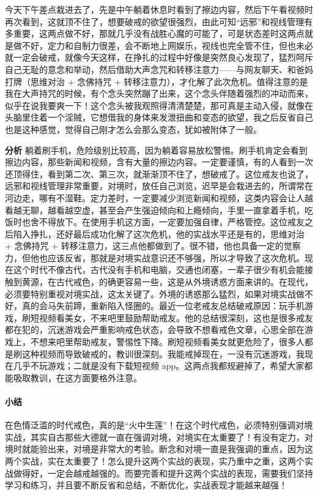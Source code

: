 \begin{case}
    今天下午差点栽进去了，先是中午躺着休息时看到了擦边内容，然后下午看视频时再次看到，这就顶不住了，想要破戒的欲望很强烈，由此可知“远邪”和视线管理有多重要，这两点做不好，那就几乎没有战胜心魔的可能了，可是状态差时这两点就是做不好，定力和自制力很差，会不断地上网娱乐，视线也完全管不住，但也未必就一定会破戒，就像今天这样，在挣扎的过程中好像是突然良心发现了，猛烈呵斥自己无耻的意念和举动，然后借助大声念咒和转移注意力——与网友聊天、和爸妈打牌（思维对治 + 念佛持咒 + 转移注意力），才化解了此次危机。值得注意的是我在大声持咒的时候，有个念头突然蹦了出来，这个念头伴随着强烈的冲动而来，似乎在说我要爽一下！这个念头被我观照得清清楚楚，那可真是主动入侵，就像在头脑里住着一个淫贼，它想借我的身体来发泄扭曲和变态的欲望，我之后反省自己也是这种感觉，觉得自己刚才怎么会那么变态，犹如被附体了一般。

    \textbf{分析} 躺着刷手机，危险级别比较高，因为躺着容易放松警惕。刷手机肯定会看到擦边内容，那些新闻和视频，含有大量的擦边内容。一定要谨慎，有的人看到一次还顶得住，看到第二次、第三次，就渐渐顶不住了，想破戒了。这位戒友也说了，远邪和视线管理非常重要，对境时，放任自己浏览，迟早是会栽进去的，所谓常在河边走，哪有不湿鞋。定力差时，一定要减少浏览新闻和视频，这类内容会让人越看越无聊，越看越空虚，甚至会产生强迫倾向和上瘾倾向，手里一直拿着手机，吃饭时也舍不得放下。在使用手机这方面，一定要加强自律，严格管控。这位戒友之后陷入挣扎，还好最后成功化解了这次危机，他的实战水平还是有的，思维对治 + 念佛持咒 + 转移注意力，这三点他都做到了。很不错，他也具备一定的觉察力，但他也应该反省，那就是对境实战意识还不够强，所以才导致了这次危机。现在这个时代不像古代，古代没有手机和电脑，交通也闭塞，一辈子很少有机会能接触到黄源，在古代戒色，的确更容易一些，这是从外境诱惑方面来讲的。在现代，必须要特别重视对境实战，这太关键了。外境的诱惑那么猛烈，如果对境实战做不好，真的会马失前蹄，重新陷入怪圈的。最近一位老戒友总结破戒原因：玩手机游戏，刷短视频看美女，不来吧里鼓励帮助戒友。他的总结很深刻，这也是很多戒友都在犯的，沉迷游戏会严重影响戒色状态，会导致不想看戒色文章，心思全部在游戏上，不想来吧里帮助戒友，警惕性下降。刷短视频看美女就更危险了，很多人都是刷这种视频而导致破戒的，教训很深刻。我能戒掉现在，一没有沉迷游戏，我现在几乎不玩游戏；二就是没有下载短视频 app。这两点我都规避掉了，希望大家都能吸取教训，在这方面要格外注意。
\end{case}

\paragraph*{小结}

在色情泛滥的时代戒色，真的是“火中生莲”！在这个时代戒色，必须特别强调对境实战，其实自古那些大德就一直在强调对境，对境实在太重要了！有没有定力，对境时就能验出来，对境是非常大的考验。断念和对境一直是我强调的重点，因为这两个实战，实在太重要了！怎么提升这两个实战的表现，实乃重中之重，这两个实战做得好，一定会越戒越强的。而要完善和提升这两个实战的表现，需要我们坚持学习和练习，并且要不断反省和总结，不断优化，实战表现才能越来越强！

